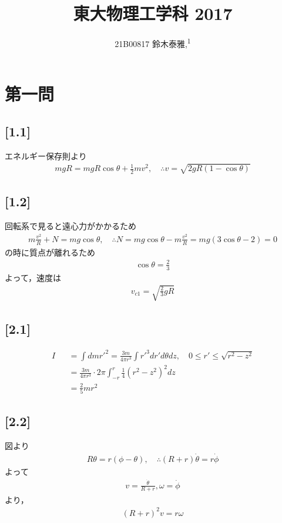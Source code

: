 \documentclass[12pt,dvipdfmx]{jsarticle}
\newcommand\authormark[1]{\textsuperscript{#1}}
\begin{document}
\title{東大物理工学科 2017}

\author{21B00817 鈴木泰雅,\authormark{1}}
\section*{\Large{第一問}}
\subsection*{\large{[1.1]}}
エネルギー保存則より
\begin{eqnarray}
  mgR = mgR\cos\theta + \frac{1}{2}mv^2, \quad\therefore v = \sqrt{2gR(1-\cos\theta)}
\end{eqnarray}
\subsection*{\large{[1.2]}}
回転系で見ると遠心力がかかるため
\begin{eqnarray}
  m\frac{v^2}{R} + N = mg\cos\theta, \quad\therefore N = mg\cos\theta-m\frac{v^2}{R} = mg(3\cos\theta-2) =0
\end{eqnarray}
の時に質点が離れるため
\begin{eqnarray}
  \cos\theta = \frac{2}{3}
\end{eqnarray}
よって，速度は
\begin{eqnarray}
  v_{c1} = \sqrt{ \frac{2}{3}gR}
\end{eqnarray}
\subsection*{\large{[2.1]}}
\begin{eqnarray}
  I &&= \int dm r'^2 = \frac{3m}{4\pi r^3}\int r'^3 dr' d\theta dz , \quad 0 \leq r' \leq \sqrt{r^2-z^2}\\
  &&=   \frac{3m}{4\pi r^3}\cdot 2\pi \int_{-r}^{r} \frac{1}{4} (r^2-z^2)^2 dz\\
  &&= \frac{2}{5}mr^2
\end{eqnarray}
\subsection*{\large{[2.2]}}
図より
\begin{eqnarray}
  R\theta = r(\phi-\theta), \quad\therefore (R+r)\dot{\theta} = r\dot{\phi}
\end{eqnarray}
よって
\begin{eqnarray}
  v = \frac{\dot{\theta}}{R+r}, \omega = \dot{\phi}
\end{eqnarray}
より，
\begin{eqnarray}
  (R+r)^2 v = r\omega
\end{eqnarray}
\end{document}
